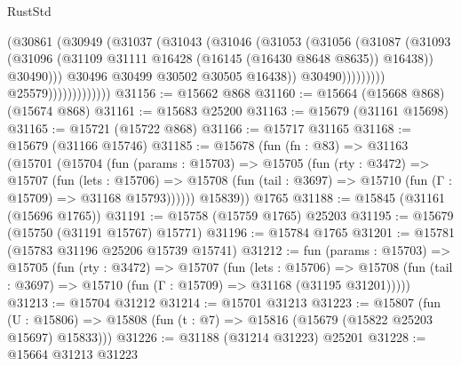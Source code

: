 \begin{lexlean}{RustStd}
\begin{coremodule}
                                        (@30861
                                          (@30949
                                            (@31037
                                              (@31043
                                                (@31046
                                                  (@31053
                                                    (@31056
                                                      (@31087
                                                        (@31093
                                                          (@31096
                                                            (@31109
                                                              @31111
                                                              @16428
                                                              (@16145 (@16430 @8648 @8635))
                                                              @16438))
                                                          @30490)))
                                                    @30496
                                                    @30499
                                                    @30502
                                                    @30505
                                                    @16438))
                                                @30490)))))))))
                              @25579)))))))))))))
@31156 := @15662 @868
@31160 := @15664 (@15668 @868) (@15674 @868)
@31161 := @15683 @25200
@31163 := @15679 (@31161 @15698)
@31165 := @15721 (@15722 @868)
@31166 := @15717 @31165
@31168 := @15679 (@31166 @15746)
@31185 := @15678
    (fun (fn : @83) =>
    @31163
      (@15701
        (@15704
          (fun (params : @15703) =>
          @15705
            (fun (rty : @3472) =>
            @15707
              (fun (lets : @15706) =>
              @15708 (fun (tail : @3697) => @15710 (fun (Γ : @15709) => @31168 @15793))))))
        @15839))
    @1765
@31188 := @15845 (@31161 (@15696 @1765))
@31191 := @15758 (@15759 @1765) @25203
@31195 := @15679 (@15750 (@31191 @15767) @15771)
@31196 := @15784 @1765
@31201 := @15781 (@15783 @31196 @25206 @15739 @15741)
@31212 := fun (params : @15703) =>
  @15705
    (fun (rty : @3472) =>
    @15707
      (fun (lets : @15706) =>
      @15708 (fun (tail : @3697) => @15710 (fun (Γ : @15709) => @31168 (@31195 @31201)))))
@31213 := @15704 @31212
@31214 := @15701 @31213
@31223 := @15807
    (fun (U : @15806) => @15808 (fun (t : @7) => @15816 (@15679 (@15822 @25203 @15697) @15833)))
@31226 := @31188 (@31214 @31223) @25201
@31228 := @15664 @31213 @31223

\end{coremodule}
\end{lexlean}
